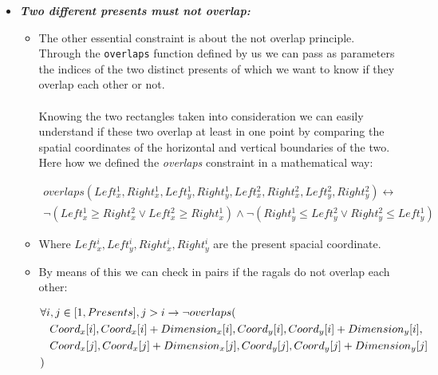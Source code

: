 \begin{itemize}
	\newpage
	\item \textbf{\textit{Two different presents must not overlap:}}
	\begin{itemize}
		\item[] 
		The other essential constraint is about the not overlap principle.
		\\
		Through the \texttt{overlaps} function defined by us we can pass as parameters the indices of the two distinct presents of which we want to know if they overlap each other or not.
		\\\\
		Knowing the two rectangles taken into consideration we can easily understand if these two overlap at least in one point by comparing the spatial coordinates of the horizontal and vertical boundaries of the two.
		\\
		Here how we defined the \textit{overlaps} constraint in a mathematical way:
		\begin{adjustwidth}{-3cm}{}\begin{equation*}\begin{split}
			overlaps(
				Left^1_x, Right^1_x, Left^1_y, Right^1_y,
				Left^2_x, Right^2_x, Left^2_y, Right^2_y
			) \leftrightarrow \\
			\neg (Left^1_x \geq Right^2_x \vee Left^2_x \geq Right^1_x) \wedge 
			\neg (Right^1_y \leq Left^2_y \vee Right^2_y \leq Left^1_y)
		\end{split}\end{equation*}\end{adjustwidth}
		\item[] Where $Left^i_x, Left^i_y, Right^i_x, Right^i_y$ are the present spacial coordinate.
		\item[] By means of this we can check in pairs if the ragals do not overlap each other:
		\begin{adjustwidth}{-2.8cm}{}\begin{equation*}\begin{split}
			&\forall i, j \in [1, Presents], j > i \rightarrow \neg overlaps(\\
			&\hspace{0.3cm} Coord_x[i], Coord_x[i] + Dimension_x[i], Coord_y[i], Coord_y[i] + Dimension_y[i],\\
			&\hspace{0.3cm} Coord_x[j], Coord_x[j] + Dimension_x[j], Coord_y[j], Coord_y[j] + Dimension_y[j]\\
			&)
		\end{split}\end{equation*}\end{adjustwidth}
	

\end{itemize}
\end{itemize}
